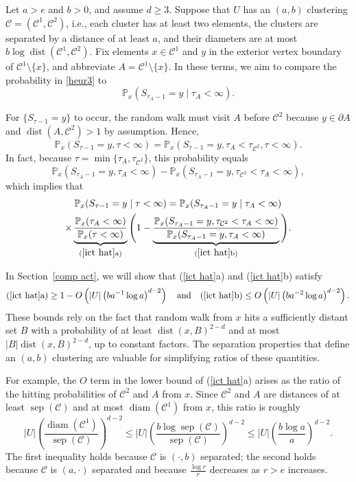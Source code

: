 \documentclass[11pt,reqno]{amsart}
\theoremstyle{definition}
\numberwithin{equation}{section}
\renewcommand{\P}{\mathbb{P}}
\newcommand{\1}{\mathbf{1}}
\newcommand{\bdy}{\partial}
\DeclareMathOperator{\dist}{dist}
\DeclareMathOperator{\diam}{diam}
\DeclareMathOperator{\sep}{sep}
\newcommand{\CC}{\mathcal{C}}
\begin{document}
Let $a > e$ and $b > 0$, and assume $d \geq 3$. Suppose that $U$ has an $(a,b)$ clustering $\CC = (\CC^1, \CC^2)$, i.e., each cluster has at least two elements, the clusters are separated by a distance of at least $a$, and their diameters are at most $b \log \dist (\CC^1, \CC^2)$. Fix elements $x \in \CC^1$ and $y$ in the exterior vertex boundary of $\CC^1 {\setminus} \{x\}$, and abbreviate $A = \CC^1 {\setminus} \{x\}$. In these terms, we aim to compare the probability in \eqref{heur3} to
\begin{equation*}
\P_x (S_{\tau_A-1} = y \mid \tau_A < \infty).
\end{equation*}

For $\{S_{\tau-1} = y\}$ to occur, the random walk must visit $A$ before $\CC^2$ because $y \in \bdy A$ and $\dist (A, \CC^2) > 1$ by assumption. Hence,   
\[
\P_x ( S_{\tau - 1} = y, \tau < \infty) = \P_x (S_{\tau - 1} = y, \tau_A < \tau_{\CC^2}, \tau < \infty).
\]
In fact, because $\tau = \min \{\tau_A, \tau_{\CC^2}\}$, this probability equals
\[
\P_x (S_{\tau_A - 1} = y, \tau_A < \infty) - \P_x (S_{\tau_A - 1} = y, \tau_{\CC^2} < \tau_A < \infty),
\]
which implies that
\begin{multline}\label{ict hat}
\P_x ( S_{\tau - 1} = y \mid \tau < \infty) = \P_x (S_{\tau_A - 1} = y \mid \tau_A < \infty)\\ 
\times \underbrace{\frac{\P_x (\tau_A < \infty)}{\P_x (\tau < \infty)}}_{( \ref{ict hat} \text{a})} \Bigg( 1 - \underbrace{\frac{\P_x (S_{\tau_A - 1} = y, \tau_{\CC^2} < \tau_A < \infty)}{\P_x (S_{\tau_A - 1} = y, \tau_A < \infty)}}_{( \ref{ict hat} \text{b})} \Bigg).
\end{multline}


In Section~\ref{comp act}, we will show that (\ref{ict hat}a) and (\ref{ict hat}b) satisfy
\[
\text{(\ref{ict hat}a)} \geq 1 - O \left( |U| \left( b a^{-1} \log a\right)^{d-2} \right) \quad \text{and} \quad \text{(\ref{ict hat}b)} \leq O \left( |U| \left(b a^{-2} \log a \right)^{d-2} \right). 
\]
These bounds rely on the fact that random walk from $x$ hits a sufficiently distant set $B$ with a probability of at least $\dist(x,B)^{2-d}$ and at most $|B| \dist(x,B)^{2-d}$, up to constant factors. The separation properties that define an $(a,b)$ clustering are valuable for simplifying ratios of these quantities.

For example, the $O$ term in the lower bound of (\ref{ict hat}a) arises as the ratio of the hitting probabilities of $\CC^2$ and $A$ from $x$. Since $\CC^2$ and $A$ are distances of at least $\sep (\CC)$ and at most $\diam (\CC^1)$ from $x$, this ratio is roughly
\begin{equation*}
|U| \left( \frac{\diam (\CC^1)}{\sep (\CC)} \right)^{d-2} \leq |U| \left( \frac{b \log \sep (\CC)}{\sep (\CC)} \right)^{d-2} \leq |U| \left( \frac{b \log a}{a} \right)^{d-2}.
\end{equation*}
The first inequality holds because $\CC$ is $(\cdot, b)$ separated; the second holds because $\CC$ is $(a,\cdot)$ separated and because $\frac{\log r}{r}$ decreases as $r > e$ increases.
\end{document}
